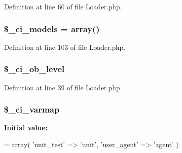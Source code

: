 Definition at line 60 of file Loader.\+php.

\subsubsection[{\texorpdfstring{\$\+\_\+ci\+\_\+models}{$_ci_models}}]{\setlength{\rightskip}{0pt plus 5cm}\$\+\_\+ci\+\_\+models = array()\hspace{0.3cm}{\ttfamily [protected]}}\hypertarget{class_c_i___loader_adf3c08ef6905b17b2237bfa89d556f2c}{}\label{class_c_i___loader_adf3c08ef6905b17b2237bfa89d556f2c}


Definition at line 103 of file Loader.\+php.

\subsubsection[{\texorpdfstring{\$\+\_\+ci\+\_\+ob\+\_\+level}{$_ci_ob_level}}]{\setlength{\rightskip}{0pt plus 5cm}\$\+\_\+ci\+\_\+ob\+\_\+level\hspace{0.3cm}{\ttfamily [protected]}}\hypertarget{class_c_i___loader_a499cf11349613b24142f9c13aa83ee1b}{}\label{class_c_i___loader_a499cf11349613b24142f9c13aa83ee1b}


Definition at line 39 of file Loader.\+php.

\subsubsection[{\texorpdfstring{\$\+\_\+ci\+\_\+varmap}{$_ci_varmap}}]{\setlength{\rightskip}{0pt plus 5cm}\$\+\_\+ci\+\_\+varmap\hspace{0.3cm}{\ttfamily [protected]}}\hypertarget{class_c_i___loader_a8dd33a8ab99688451b1f811f122d1114}{}\label{class_c_i___loader_a8dd33a8ab99688451b1f811f122d1114}
{\bfseries Initial value\+:}
\begin{DoxyCode}
= array(
        \textcolor{stringliteral}{'unit\_test'} => \textcolor{stringliteral}{'unit'},
        \textcolor{stringliteral}{'user\_agent'} => \textcolor{stringliteral}{'agent'}
    )
\end{DoxyCode}


